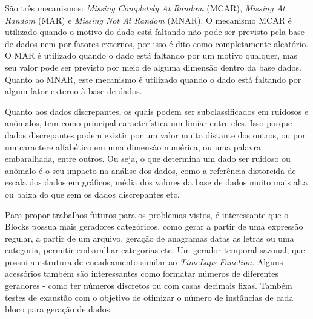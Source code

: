 \documentclass[
	12pt,				%
	openright,			%
	oneside,			%
	a4paper,			%
	english,			%
	brazil				%
	]{abntex2}
\begin{document}
São três mecanismos: \emph{Missing Completely At Random} (MCAR), \emph{Missing At Random} (MAR) e \emph{Missing Not At Random} (MNAR).
O mecanismo MCAR é utilizado quando o motivo do dado está faltando não pode ser previsto pela base de dados nem por fatores externos, por isso é dito como completamente aleatório.
O MAR é utilizado quando o dado está faltando por um motivo qualquer, mas seu valor pode ser previsto por meio de alguma dimensão dentro da base dados.
Quanto ao MNAR, este mecanismo é utilizado quando o dado está faltando por algum fator externo à base de dados.
\par
Quanto aos dados discrepantes, os quais podem ser subclassificados em ruidosos e anômalos, tem como principal característica um limiar entre eles.
Isso porque dados discrepantes podem existir por um valor muito distante dos outros, ou por um caractere alfabético em uma dimensão numérica, ou uma palavra embaralhada, entre outros.
Ou seja, o que determina um dado ser ruidoso ou anômalo é o seu impacto na análise dos dados, como a referência distorcida de escala dos dados em gráficos, média dos valores da base de dados muito mais alta ou baixa do que sem os dados discrepantes etc.
\par
Para propor trabalhos futuros para os problemas vistos, é interessante que o Blocks possua mais geradores categóricos, como gerar a partir de uma expressão regular, a partir de um arquivo, geração de anagramas datas as letras ou uma categoria, permitir embaralhar categorias etc.
Um gerador temporal sazonal, que possui a estrutura de encadeamento similar ao \emph{TimeLaps Function}.
Alguns acessórios também são interessantes como formatar números de diferentes geradores - como ter números discretos ou com casas decimais fixas.
Também testes de exaustão com o objetivo de otimizar o número de instâncias de cada bloco para geração de dados. 
\par

\postextual



\appendix
\end{document}
